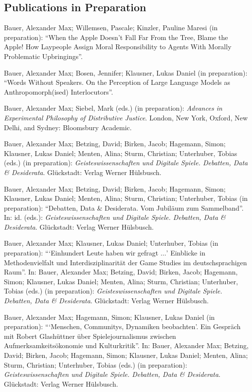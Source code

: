 \documentclass[a4paper,10pt]{article}
\newenvironment{literature}{%
   \parskip6pt\parindent0pt\raggedright
   \def\lititem{\hangindent=1cm\hangafter1}}{%
   \par\ignorespaces}
\begin{document}
\subsection*{Publications in Preparation}
\begin{literature}
\lititem Bauer, Alexander Max; Willemsen, Pascale; Kinzler, Pauline Maresi (in preparation): \enquote{When the Apple Doesn't Fall Far From the Tree, Blame the Apple! How Laypeople Assign Moral Responsibility to Agents With Morally Problematic Upbringings}.

\lititem Bauer, Alexander Max; Bosen, Jennifer; Klausner, Lukas Daniel (in preparation): \enquote{Words Without Speakers. On the Perception of Large Language Models as Anthropomorph(ised) Interlocutors}.

\lititem Bauer, Alexander Max; Siebel, Mark (eds.) (in preparation): \textit{Advances in Experimental Philosophy of Distributive Justice}. London, New York, Oxford, New Delhi, and Sydney: Bloomsbury Academic.

\lititem Bauer, Alexander Max; Betzing, David; Birken, Jacob; Hagemann, Simon; Klausner, Lukas Daniel; Menten, Alina; Sturm, Christian; Unterhuber, Tobias (eds.) (in preparation): \textit{Geisteswissenschaften und Digitale Spiele. Debatten, Data \& Desiderata}. Glückstadt: Verlag Werner Hülsbusch.

\lititem Bauer, Alexander Max; Betzing, David; Birken, Jacob; Hagemann, Simon; Klausner, Lukas Daniel; Menten, Alina; Sturm, Christian; Unterhuber, Tobias (in preparation): \enquote{Debatten, Data \& Desiderata. Vom Jubiläum zum Sammelband}. In: id. (eds.): \textit{Geisteswissenschaften und Digitale Spiele. Debatten, Data \& Desiderata}. Glückstadt: Verlag Werner Hülsbusch.

\lititem Bauer, Alexander Max; Klausner, Lukas Daniel; Unterhuber, Tobias (in preparation): \enquote{\enquote{Einhundert Leute haben wir gefragt $\ldots$} Einblicke in Methodenvielfalt und Interdisziplinarität der Game Studies im deutschsprachigen Raum}. In: Bauer, Alexander Max; Betzing, David; Birken, Jacob; Hagemann, Simon; Klausner, Lukas Daniel; Menten, Alina; Sturm, Christian; Unterhuber, Tobias (eds.) (in preparation): \textit{Geisteswissenschaften und Digitale Spiele. Debatten, Data \& Desiderata}. Glückstadt: Verlag Werner Hülsbusch.

\lititem Bauer, Alexander Max; Hagemann, Simon; Klausner, Lukas Daniel (in preparation): \enquote{\enquote{Menschen, Communitys, Dynamiken beobachten}. Ein Gespräch mit Robert Glashüttner über Spielejournalismus zwischen Aufmerksamkeitsökonomie und Kulturkritik}. In: Bauer, Alexander Max; Betzing, David; Birken, Jacob; Hagemann, Simon; Klausner, Lukas Daniel; Menten, Alina; Sturm, Christian; Unterhuber, Tobias (eds.) (in preparation): \textit{Geisteswissenschaften und Digitale Spiele. Debatten, Data \& Desiderata}. Glückstadt: Verlag Werner Hülsbusch.
\end{literature}
\end{document}
